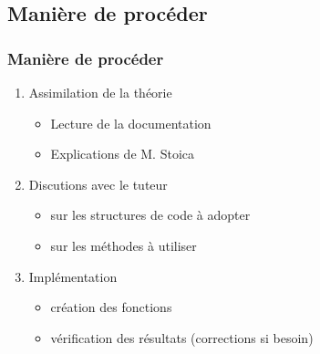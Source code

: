 \documentclass{beamer}
\theoremstyle{remark}
\theoremstyle{plain}
\begin{document}
\subsection{Manière de procéder}
\begin{frame}
  \frametitle{Manière de procéder}
  \begin{enumerate}
    \item{Assimilation de la théorie}
    \begin{itemize}%
        [triangle]
        \item{Lecture de la documentation}
        \item{Explications de M. Stoica}
    \end{itemize}
    \vspace{0.5cm}
    \item{Discutions avec le tuteur}
    \begin{itemize}%
        [triangle]
        \item{sur les structures de code à adopter}
        \item{sur les méthodes à utiliser}
    \end{itemize}
    \vspace{0.5cm}
    \item{Implémentation}
    \begin{itemize}%
        [triangle]
        \item{création des fonctions}
        \item{vérification des résultats (corrections si besoin)}
    \end{itemize}
  \end{enumerate}
\end{frame}
\end{document}
